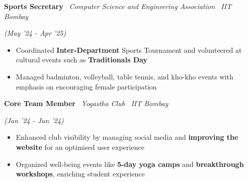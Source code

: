 \documentclass[10pt]{article}
\newcommand{\xfill}[2][1ex]{
	\dimen0=#2\advance\dimen0 by #1
	\leaders\hrule height \dimen0 depth -#1\hfill
}
\renewcommand{\section}[1]{
	\vspace{5pt}
	{\color{Blue}{\Large\scshape\raggedright #1\xfill[0pt]{0.5pt}}}
}
\newcommand{\subsectionthree}[3]{
    \vspace{2pt}
    {
        \large
        {\color{Green} \textbf{#1}} \textbar\ {\sl #2} \filldate{#3}
    }
}
\newcommand{\filldate}[1]{\strut\hfill {\small \textit{(#1)}}}
\begin{document}
\vspace{-3pt}

\subsectionthree{Sports Secretary}{Computer Science and Engineering Association \textbar\ \textit{IIT Bombay}}{May '24 - Apr '25}
\begin{itemize}
    \item Coordinated \textbf{Inter-Department} Sports Tournament and volunteered at cultural events such as \textbf{Traditionals Day}
    \item Managed badminton, volleyball, table tennis, and kho-kho events with emphasis on encouraging female participation
\end{itemize}

\vspace{-14pt}

\subsectionthree{Core Team Member}{Yogastha Club \textbar\ \textit{IIT Bombay}}{Jan '24 - Jun '24} 
\begin{itemize}
   \item Enhanced club visibility by managing social media and \textbf{improving the website} for an optimised user experience
    \item Organized well-being events like \textbf{5-day yoga camps} and \textbf{breakthrough workshops}, enriching student experience
\end{itemize}

\vspace{-17pt}

\section{Extracurricular Activities}
\vspace{-2pt}
\end{document}
